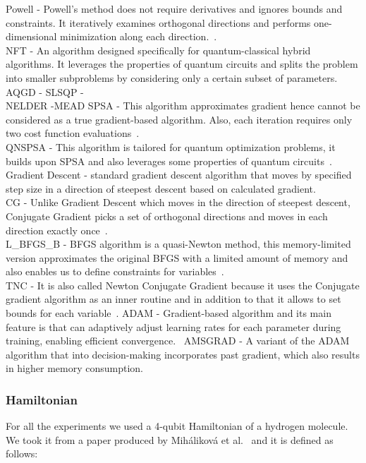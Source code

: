 Powell - Powell's method does not require derivatives and ignores bounds and constraints. It iteratively examines orthogonal directions and performs one-dimensional minimization along each direction.~\cite{powell}.\\
NFT - An algorithm designed specifically for quantum-classical hybrid algorithms. It leverages the properties of quantum circuits and splits the problem into smaller subproblems by considering only a certain subset of parameters.~\cite{nft}
AQGD - 
SLSQP - \\
NELDER -MEAD
SPSA - This algorithm approximates gradient hence cannot be considered as a true gradient-based algorithm. Also, each iteration requires only two cost function evaluations~\cite{spsa}.\\
QNSPSA - This algorithm is tailored for quantum optimization problems, it builds upon SPSA and also leverages some properties of quantum circuits~\cite{qnspsa}.\\
Gradient Descent - standard gradient descent algorithm that moves by specified step size in a direction of steepest descent based on calculated gradient.~\cite{gd}\\
CG - Unlike Gradient Descent which moves in the direction of steepest descent, Conjugate Gradient picks a set of orthogonal directions and moves in each direction exactly once~\cite{cg}.\\ 
L\_BFGS\_B - BFGS algorithm is a quasi-Newton method, this memory-limited version approximates the original BFGS with a limited amount of memory and also enables us to define constraints for variables~\cite{lbfgsb}.\\
TNC - It is also called Newton Conjugate Gradient because it uses the Conjugate gradient algorithm as an inner routine and in addition to that it allows to set bounds for each variable~\cite{tnc}.
ADAM - Gradient-based algorithm and its main feature is that can adaptively adjust learning rates for each parameter during training, enabling efficient convergence.~\cite{adam}
AMSGRAD - A variant of the ADAM algorithm that into decision-making incorporates past gradient, which also results in higher memory consumption.~\cite{amsgrad}
\subsubsection{Hamiltonian}
For all the experiments we used a 4-qubit Hamiltonian of a hydrogen molecule. We took it from a paper produced by Miháliková et al.~\cite{mihalikova} and it is defined as follows:

